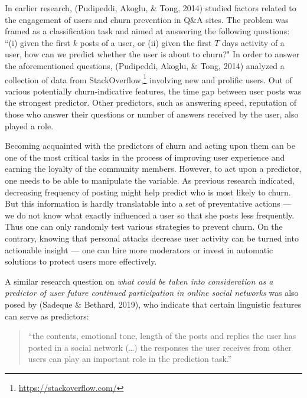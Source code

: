 \documentclass[
  10pt,
  dvipsnames]{scrartcl}
\begin{document}
In earlier research, (Pudipeddi, Akoglu, \& Tong, 2014) studied factors
related to the engagement of users and churn prevention in Q\&A sites.
The problem was framed as a classification task and aimed at answering
the following questions: ``(i) given the first \(k\) posts of a user, or
(ii) given the first \(T\) days activity of a user, how can we predict
whether the user is about to churn?" In order to answer the
aforementioned questions, (Pudipeddi, Akoglu, \& Tong, 2014) analyzed a
collection of data from
StackOverflow,\footnote{\url{https://stackoverflow.com/}} involving new
and prolific users. Out of various potentially churn-indicative
features, the time gap between user posts was the strongest predictor.
Other predictors, such as answering speed, reputation of those who
answer their questions or number of answers received by the user, also
played a role.

Becoming acquainted with the predictors of churn and acting upon them
can be one of the most critical tasks in the process of improving user
experience and earning the loyalty of the community members. However, to
act upon a predictor, one needs to be able to manipulate the variable.
As previous research indicated, decreasing frequency of posting might
help predict who is most likely to churn. But this information is hardly
translatable into a set of preventative actions --- we do not know what
exactly influenced a user so that she posts less frequently. Thus one
can only randomly test various strategies to prevent churn. On the
contrary, knowing that personal attacks decrease user activity can be
turned into actionable insight --- one can hire more moderators or
invest in automatic solutions to protect users more effectively.

A similar research question on
\emph{what could be taken into consideration as a predictor of user future continued participation in online social networks}
was also posed by (Sadeque \& Bethard, 2019), who indicate that certain
linguistic features can serve as predictors:

\begin{quote}``the contents, emotional tone, length of the posts and replies the user has posted in a social network (\dots) the responses the user receives from other users can play an important role in the prediction task.''\end{quote}
\end{document}
